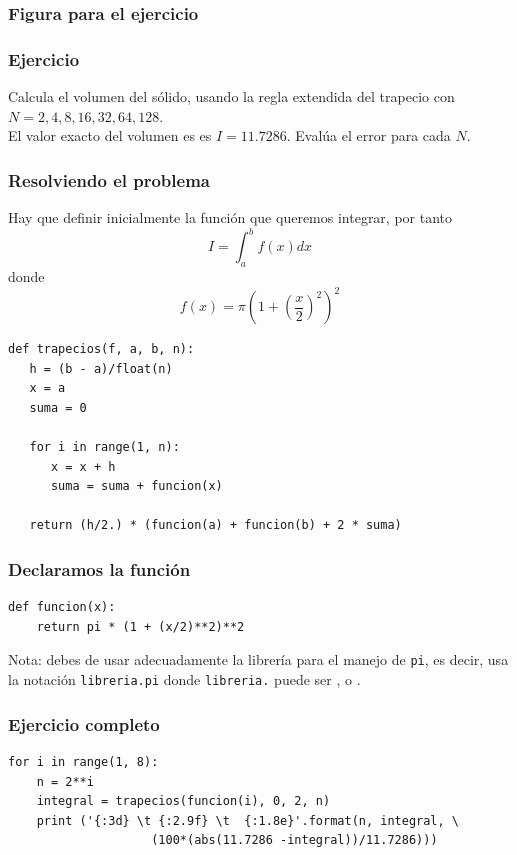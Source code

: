 \begin{frame}
\frametitle{Figura para el ejercicio}
\begin{figure}
	\centering
	
\end{figure}
\end{frame}
\begin{frame}
\frametitle{Ejercicio}
Calcula el volumen del sólido, usando la regla extendida del trapecio con $N = 2, 4, 8, 16, 32, 64, 128$.
\\
\bigskip
El valor exacto del volumen es es $I = 11.7286$. Evalúa el error para cada $N$.
\end{frame}
\begin{frame}
\frametitle{Resolviendo el problema}
Hay que definir inicialmente la función que queremos integrar, por tanto
\[ I = \int_{a}^{b} f(x) dx\]
donde
\[ f(x) = \pi  \left( 1 + \left( \dfrac{x}{2} \right)^{2} \right)^{2}  \]
\end{frame}
\begin{frame}[fragile]
\begin{lstlisting}[caption=Código para la función trapecios, style=FormattedNumber, basicstyle=\linespread{1.1}\ttfamily=\small, columns=fullflexible]
def trapecios(f, a, b, n):
   h = (b - a)/float(n)
   x = a
   suma = 0
   
   for i in range(1, n):
      x = x + h
      suma = suma + funcion(x)
   
   return (h/2.) * (funcion(a) + funcion(b) + 2 * suma)
\end{lstlisting}
\end{frame}
\begin{frame}[fragile]
\frametitle{Declaramos la función}
\begin{lstlisting}[caption=Código para la función trapecios, style=FormattedNumber, basicstyle=\linespread{1.1}\ttfamily=\small, columns=fullflexible]
def funcion(x):
    return pi * (1 + (x/2)**2)**2
\end{lstlisting}
Nota: debes de usar adecuadamente la librería para el manejo de \texttt{pi}, es decir, usa la notación \texttt{libreria.pi} donde \texttt{libreria.} puede ser ,  o .
\end{frame}
\begin{frame}[fragile]
\frametitle{Ejercicio completo}
\begin{lstlisting}[caption=Completamos el código y evaluamos el error, style=FormattedNumber, basicstyle=\linespread{1.1}\ttfamily=\small, columns=fullflexible]
for i in range(1, 8):
    n = 2**i
    integral = trapecios(funcion(i), 0, 2, n)
    print ('{:3d} \t {:2.9f} \t  {:1.8e}'.format(n, integral, \
                    (100*(abs(11.7286 -integral))/11.7286)))
\end{lstlisting}
\end{frame}

